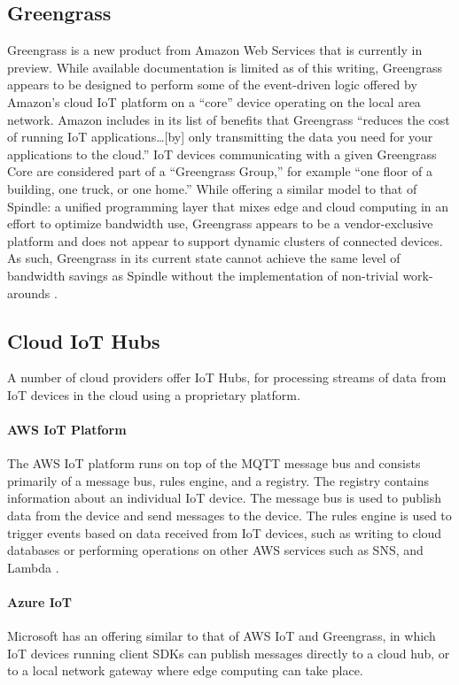 \documentclass{thesis}
\begin{document}
    \subsection{Greengrass}
        Greengrass is a new product from Amazon Web Services that is currently in preview. While available
        documentation is limited as of this writing, Greengrass appears to be designed to perform some of
        the event-driven logic offered by Amazon's cloud IoT platform on a ``core'' device operating
        on the local area network. Amazon includes in its list of benefits that Greengrass ``reduces the 
        cost of running IoT applications\dots [by] only transmitting the data you need for your applications
        to the cloud.'' IoT devices communicating with a given Greengrass Core are considered part of a
        ``Greengrass Group,'' for example ``one floor of a building, one truck, or one home.'' While offering
        a similar model to that of Spindle: a unified programming layer that mixes edge and cloud computing
        in an effort to optimize bandwidth use, Greengrass appears to be a vendor-exclusive platform and does
        not appear to support dynamic clusters of connected devices. As such, Greengrass in its current state
        cannot achieve the same level of bandwidth savings as Spindle without the implementation of non-trivial
        work-arounds \cite{greengrass}.
    \subsection{Cloud IoT Hubs}
        A number of cloud providers offer IoT Hubs, for processing streams of data from IoT devices in the cloud
        using a proprietary platform. 
        \paragraph{AWS IoT Platform}
           The AWS IoT platform runs on top of the MQTT message bus and consists primarily of a message bus, rules
           engine, and a registry. The registry contains information about an individual IoT device. The message bus
           is used to publish data from the device and send messages to the device. The rules engine is used to trigger
           events based on data received from IoT devices, such as writing to cloud databases or performing operations on
           other AWS services such as SNS, and Lambda \cite{aws:iot}.
        \paragraph{Azure IoT}
            Microsoft has an offering similar to that of AWS IoT and Greengrass, in which IoT devices running client SDKs
            can publish messages directly to a cloud hub, or to a local network gateway where edge computing can take
            place.
\end{document}
